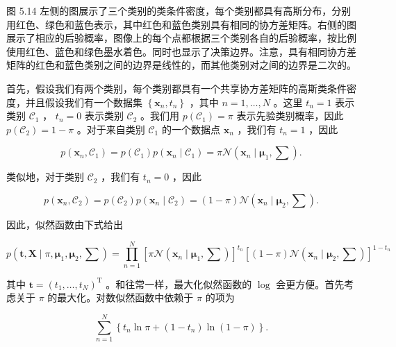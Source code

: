 \documentclass[10pt]{article}
\begin{document}
图 5.14 左侧的图展示了三个类别的类条件密度，每个类别都具有高斯分布，分别用红色、绿色和蓝色表示，其中红色和蓝色类别具有相同的协方差矩阵。右侧的图展示了相应的后验概率，图像上的每个点都根据三个类别各自的后验概率，按比例使用红色、蓝色和绿色墨水着色。同时也显示了决策边界。注意，具有相同协方差矩阵的红色和蓝色类别之间的边界是线性的，而其他类别对之间的边界是二次的。

首先，假设我们有两个类别，每个类别都具有一个共享协方差矩阵的高斯类条件密度，并且假设我们有一个数据集 \(\left\{  {{\mathbf{x}}_{n},{t}_{n}}\right\}\) ，其中 \(n = 1,\ldots ,N\) 。这里 \({t}_{n} = 1\) 表示类别 \({\mathcal{C}}_{1}\) ， \({t}_{n} = 0\) 表示类别 \({\mathcal{C}}_{2}\) 。我们用 \(p\left( {\mathcal{C}}_{1}\right)  = \pi\) 表示先验类别概率，因此 \(p\left( {\mathcal{C}}_{2}\right)  = 1 - \pi\) 。对于来自类别 \({\mathcal{C}}_{1}\) 的一个数据点 \({\mathbf{x}}_{n}\) ，我们有 \({t}_{n} = 1\) ，因此

\[
p\left( {{\mathbf{x}}_{n},{\mathcal{C}}_{1}}\right)  = p\left( {\mathcal{C}}_{1}\right) p\left( {{\mathbf{x}}_{n} \mid  {\mathcal{C}}_{1}}\right)  = \pi \mathcal{N}\left( {{\mathbf{x}}_{n} \mid  {\mathbf{\mu }}_{1},\mathbf{\sum }}\right) .
\]

类似地，对于类别 \({\mathcal{C}}_{2}\) ，我们有 \({t}_{n} = 0\) ，因此

\[
p\left( {{\mathbf{x}}_{n},{\mathcal{C}}_{2}}\right)  = p\left( {\mathcal{C}}_{2}\right) p\left( {{\mathbf{x}}_{n} \mid  {\mathcal{C}}_{2}}\right)  = \left( {1 - \pi }\right) \mathcal{N}\left( {{\mathbf{x}}_{n} \mid  {\mathbf{\mu }}_{2},\mathbf{\sum }}\right) .
\]

因此，似然函数由下式给出

\[
p\left( {\mathbf{t},\mathbf{X} \mid  \pi ,{\mathbf{\mu }}_{1},{\mathbf{\mu }}_{2},\mathbf{\sum }}\right)  = \mathop{\prod }\limits_{{n = 1}}^{N}{\left\lbrack  \pi \mathcal{N}\left( {\mathbf{x}}_{n} \mid  {\mathbf{\mu }}_{1},\mathbf{\sum }\right) \right\rbrack  }^{{t}_{n}}{\left\lbrack  \left( 1 - \pi \right) \mathcal{N}\left( {\mathbf{x}}_{n} \mid  {\mathbf{\mu }}_{2},\mathbf{\sum }\right) \right\rbrack  }^{1 - {t}_{n}} \tag{5.54}
\]

其中 \(\mathbf{t} = {\left( {t}_{1},\ldots ,{t}_{N}\right) }^{\mathrm{T}}\) 。和往常一样，最大化似然函数的 \(\log\) 会更方便。首先考虑关于 \(\pi\) 的最大化。对数似然函数中依赖于 \(\pi\) 的项为

\[
\mathop{\sum }\limits_{{n = 1}}^{N}\left\{  {{t}_{n}\ln \pi  + \left( {1 - {t}_{n}}\right) \ln \left( {1 - \pi }\right) }\right\}  . \tag{5.55}
\]
\end{document}
